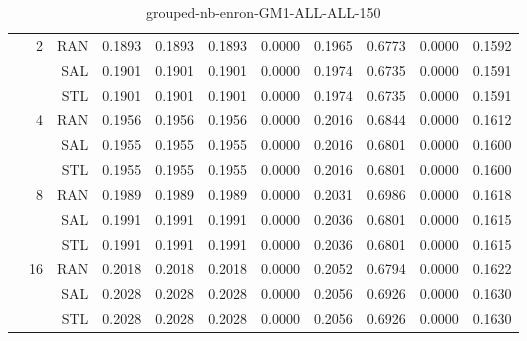 \begin{center}
\begin{table}[htbp]
\begin{center}
\begin{tabular}{ | r | r | r | r | r | r | r | r | r | r | r |}
 & \multirow{3}{*}{2} & RAN & 0.1893 & 0.1893 & 0.1893 & 0.0000 & 0.1965 & 0.6773 & 0.0000 & 0.1592\\ \cline{3-11}
 &   & SAL & 0.1901 & 0.1901 & 0.1901 & 0.0000 & 0.1974 & 0.6735 & 0.0000 & 0.1591\\ \cline{3-11}
 &   & STL & 0.1901 & 0.1901 & 0.1901 & 0.0000 & 0.1974 & 0.6735 & 0.0000 & 0.1591\\ \cline{2-11}
 & \multirow{3}{*}{4} & RAN & 0.1956 & 0.1956 & 0.1956 & 0.0000 & 0.2016 & 0.6844 & 0.0000 & 0.1612\\ \cline{3-11}
 &   & SAL & 0.1955 & 0.1955 & 0.1955 & 0.0000 & 0.2016 & 0.6801 & 0.0000 & 0.1600\\ \cline{3-11}
 &   & STL & 0.1955 & 0.1955 & 0.1955 & 0.0000 & 0.2016 & 0.6801 & 0.0000 & 0.1600\\ \cline{2-11}
 & \multirow{3}{*}{8} & RAN & 0.1989 & 0.1989 & 0.1989 & 0.0000 & 0.2031 & 0.6986 & 0.0000 & 0.1618\\ \cline{3-11}
 &   & SAL & 0.1991 & 0.1991 & 0.1991 & 0.0000 & 0.2036 & 0.6801 & 0.0000 & 0.1615\\ \cline{3-11}
 &   & STL & 0.1991 & 0.1991 & 0.1991 & 0.0000 & 0.2036 & 0.6801 & 0.0000 & 0.1615\\ \cline{2-11}
 & \multirow{3}{*}{16} & RAN & 0.2018 & 0.2018 & 0.2018 & 0.0000 & 0.2052 & 0.6794 & 0.0000 & 0.1622\\ \cline{3-11}
 &   & SAL & 0.2028 & 0.2028 & 0.2028 & 0.0000 & 0.2056 & 0.6926 & 0.0000 & 0.1630\\ \cline{3-11}
 &   & STL & 0.2028 & 0.2028 & 0.2028 & 0.0000 & 0.2056 & 0.6926 & 0.0000 & 0.1630\\ \cline{2-11}
\hline
\end{tabular}
\caption{grouped-nb-enron-GM1-ALL-ALL-150}
\end{center}
 \end{table}
\end{center}

